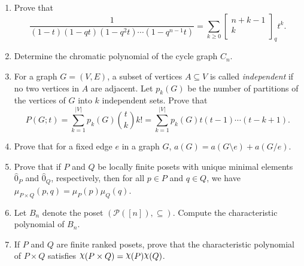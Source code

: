 \documentclass[11pt]{article}
\theoremstyle{definition}
\newcommand{\qbinom}[2]{
  \displaystyle \left[\begin{matrix}#1  \\#2  \\ \end{matrix}\right]}
\DeclareRobustCommand{\rchi}{{\mathpalette\irchi\relax}}
\newcommand{\irchi}[2]{\raisebox{\depth}{$#1\chi$}}
\begin{document}
\begin{enumerate}
\begin{enumerate}
\item Prove that
\[
\frac{1}{(1-t)(1-qt)(1-q^2t)\cdots (1-q^{n-1}t)}=\sum_{k\geq 0}\qbinom{n+k-1}{k}_qt^k.
\]

\item Determine the chromatic polynomial of the cycle graph $C_n$.

\item For a graph $G=(V,E)$, a subset of vertices $A\subseteq V$ is called \emph{independent} if no two vertices in $A$ are adjacent. Let $p_k(G)$ be the number of partitions of the vertices of $G$ into $k$ independent sets. Prove that
\[
P(G;t)=\sum_{k=1}^{|V|}p_k(G)\binom{t}{k}k!=\sum_{k=1}^{|V|}p_k(G)t(t-1)\cdots (t-k+1).
\]

\item Prove that for a fixed edge $e$ in a graph $G$, $a(G)=a(G\setminus e)+a(G/e)$.

\item Prove that if $P$ and $Q$ be locally finite posets with unique minimal elements $\hat{0}_P$ and $\hat{0}_Q$, respectively, then for all $p\in P$ and $q\in Q$, we have $\mu_{P\times Q}(p,q)=\mu_P(p)\mu_Q(q)$.

\item Let $B_n$ denote the poset $(\mathcal{P}([n]),\subseteq)$.  Compute the characteristic polynomial of $B_n$.

\item If $P$ and $Q$ are finite ranked posets, prove that the characteristic polynomial of $P\times Q$ satisfies $\rchi(P\times Q)=\rchi(P)\rchi(Q)$.

\end{enumerate}

\end{enumerate}
\end{document}
